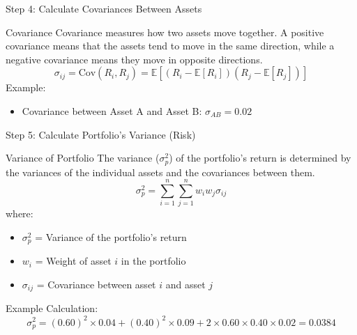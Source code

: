 \documentclass{beamer}
\begin{document}
\begin{frame}{Step 4: Calculate Covariances Between Assets}
  \begin{block}{Covariance}
    Covariance measures how two assets move together. A positive covariance means that the assets tend to move in the same direction, while a negative covariance means they move in opposite directions.
    \begin{equation*}
      \sigma_{ij} = \text{Cov}(R_i, R_j) = \mathbb{E}[(R_i - \mathbb{E}[R_i])(R_j - \mathbb{E}[R_j])]
    \end{equation*}
    Example:
    \begin{itemize}
      \item Covariance between Asset A and Asset B: \(\sigma_{AB} = 0.02\)
    \end{itemize}
  \end{block}
\end{frame}

\begin{frame}{Step 5: Calculate Portfolio's Variance (Risk)}
  \begin{block}{Variance of Portfolio}
    The variance (\(\sigma_p^2\)) of the portfolio's return is determined by the variances of the individual assets and the covariances between them.
    \begin{equation*}
      \sigma_p^2 = \sum_{i=1}^{n} \sum_{j=1}^{n} w_i w_j \sigma_{ij}
    \end{equation*}
    where:
    \begin{itemize}
      \item \( \sigma_p^2 \) = Variance of the portfolio's return
      \item \( w_i \) = Weight of asset \( i \) in the portfolio
      \item \( \sigma_{ij} \) = Covariance between asset \( i \) and asset \( j \)
    \end{itemize}
    Example Calculation:
    \begin{equation*}
      \sigma_p^2 = (0.60)^2 \times 0.04 + (0.40)^2 \times 0.09 + 2 \times 0.60 \times 0.40 \times 0.02 = 0.0384
    \end{equation*}
  \end{block}
\end{frame}
\end{document}
